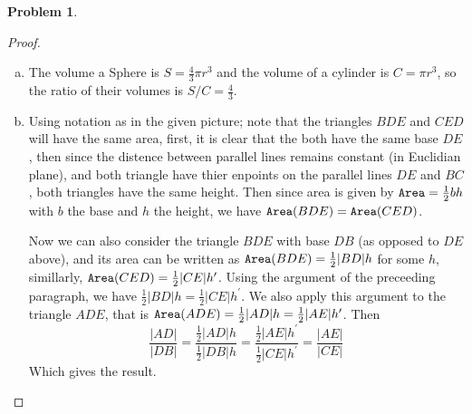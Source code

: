 \documentclass{article}
\newcommand{\A}{{\tt Area}}
\newtheorem{prb}{Problem}
\begin{document}
	   \begin{prb}  \end{prb} 
	   \begin{proof} 
	   	\begin{enumerate}[(a)]
			\item The volume a Sphere is $S = \frac{4}{3} \pi r^3$ and the volume of a cylinder is 
				$C = \pi r^3$, so the ratio of their volumes is $S/C = 
				\frac{4}{3}$. 

			\item 
				Using notation as in the given picture; note that 
				the triangles $BDE$ and $CED$ will have the same area, 
				first, it is clear that the both have the same base $DE$, then since the distence 
				between parallel lines remains constant 
				(in Euclidian plane), and both triangle have thier 
				enpoints on the parallel lines $DE$ and $BC$, both triangles have the same height. 
				Then since area is given by $\A = \frac{1}{2}bh$ with $b$ the base and $h$ 
				the height, we have $\A(BDE) = \A(CED)$. 

				Now we can also consider the triangle $BDE$ with base $DB$ (as 
				opposed to $DE$ above), and its area can be written as $\A(BDE) = \frac{1}{2}|BD|h$ for
				some $h$, simillarly, $\A(CED) = \frac{1}{2} |CE| h^\prime$. Using the argument of the
				preceeding paragraph, we have $\frac{1}{2}|BD|h = \frac{1}{2} |CE| h^\prime$. 
				We also apply this argument to the triangle $ADE$, that is 
				$\A(ADE) = \frac{1}{2} |AD| h = \frac{1}{2} |AE| h^\prime$. 
				Then 
				\[ \frac{|AD|}{|DB|} = \frac{\tfrac{1}{2}|AD|h}{\tfrac{1}{2}|DB|h} 
				=  \frac{\tfrac{1}{2}|AE|h^\prime}{\tfrac{1}{2}|CE|h^\prime} = \frac{|AE|}{|CE|} \]
				Which gives the result. 
	   	\end{enumerate}	
	   \end{proof} 
\end{document}
